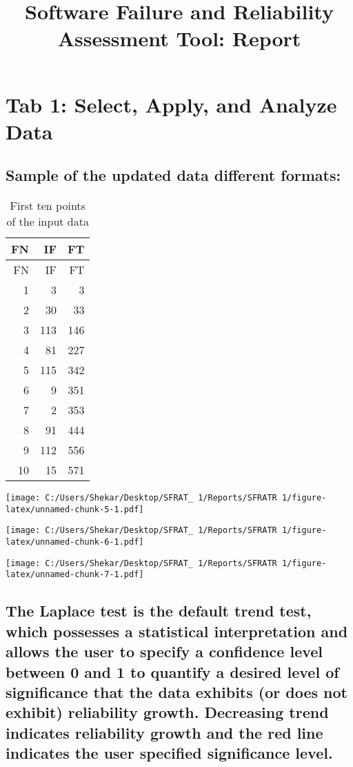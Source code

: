 \documentclass[]{article}
\title{Software Failure and Reliability Assessment Tool: Report}
\author{}
\date{}
\begin{document}
\maketitle

\section{Tab 1: Select, Apply, and Analyze
Data}\label{tab-1-select-apply-and-analyze-data}

\subsection{Sample of the updated data different
formats:}\label{sample-of-the-updated-data-different-formats}

\begin{longtable}[]{@{}rrr@{}}
\caption{First ten points of the input data}\tabularnewline
\toprule
FN & IF & FT\tabularnewline
\midrule
\endfirsthead
\toprule
FN & IF & FT\tabularnewline
\midrule
\endhead
1 & 3 & 3\tabularnewline
2 & 30 & 33\tabularnewline
3 & 113 & 146\tabularnewline
4 & 81 & 227\tabularnewline
5 & 115 & 342\tabularnewline
6 & 9 & 351\tabularnewline
7 & 2 & 353\tabularnewline
8 & 91 & 444\tabularnewline
9 & 112 & 556\tabularnewline
10 & 15 & 571\tabularnewline
\bottomrule
\end{longtable}

\texttt{[image: C:/Users/Shekar/Desktop/SFRAT\_~1/Reports/SFRATR~1/figure-latex/unnamed-chunk-5-1.pdf]}

\texttt{[image: C:/Users/Shekar/Desktop/SFRAT\_~1/Reports/SFRATR~1/figure-latex/unnamed-chunk-6-1.pdf]}

\texttt{[image: C:/Users/Shekar/Desktop/SFRAT\_~1/Reports/SFRATR~1/figure-latex/unnamed-chunk-7-1.pdf]}

\subsection{The Laplace test is the default trend test, which possesses
a statistical interpretation and allows the user to specify a confidence
level between 0 and 1 to quantify a desired level of significance that
the data exhibits (or does not exhibit) reliability growth. Decreasing
trend indicates reliability growth and the red line indicates the user
specified significance
level.}\label{the-laplace-test-is-the-default-trend-test-which-possesses-a-statistical-interpretation-and-allows-the-user-to-specify-a-confidence-level-between-0-and-1-to-quantify-a-desired-level-of-significance-that-the-data-exhibits-or-does-not-exhibit-reliability-growth.-decreasing-trend-indicates-reliability-growth-and-the-red-line-indicates-the-user-specified-significance-level.}
\end{document}
